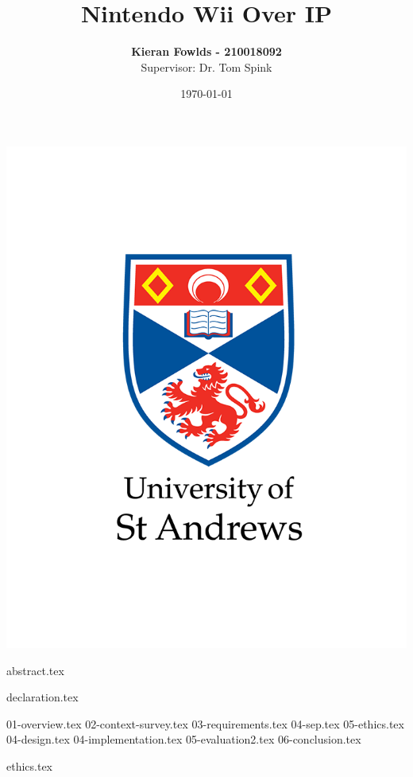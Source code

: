 \documentclass[12pt,abstract=true,headings=standardclasses,titlepage=false]{scrreprt}
\title{Nintendo Wii Over IP}
\author{\textbf{Kieran Fowlds - 210018092} \\
Supervisor: Dr. Tom Spink}
\date{\today}
\begin{document}
\maketitle
\thispagestyle{empty}
\vfill
\begin{center}
	\includegraphics[width=0.6\linewidth]{figures/logo.png}
\end{center}

\newpage
{abstract.tex}
\thispagestyle{empty}
\clearpage


\newpage
{declaration.tex}
\thispagestyle{empty}
\clearpage

\newpage
\setcounter{page}{1}

\tableofcontents
\clearpage
{}
\setcounter{page}{1}

{01-overview.tex}
{02-context-survey.tex}
{03-requirements.tex}
{04-sep.tex}
{05-ethics.tex}
{04-design.tex}
{04-implementation.tex}
{05-evaluation2.tex}
{06-conclusion.tex}

\printbibliography[title=References]

\appendix
\clearpage
\renewcommand{\thepage}{}
{ethics.tex}
\end{document}
